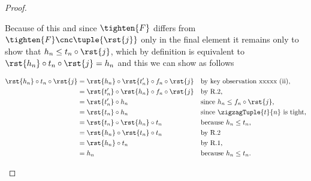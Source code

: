 \begin{proof}
\begin{enumerate}[(i)]
Because of this and since $\tighten{F}$ differs from
$\tighten{F} \cnc \tuple{\rst{j}}$
only in the final element it remains only to show that
$h_n \leq t_n \circ \rst{j}$, which by definition
is equivalent to
$\rst{h_n} \circ t_n \circ \rst{j} =h_n$
and this we can show as follows

\begin{align*}
\rst{h_n} \circ t_n \circ \rst{j} 
  &= \rst{h_n} \circ \rst{t'_n} \circ f_n \circ \rst{j} 
      && \mbox{by key observation xxxxx (ii),}\\
  &= \rst{t'_n} \circ \rst{h_n} \circ f_n \circ \rst{j}
      && \mbox{by R.2,}\\
  &= \rst{t'_n} \circ h_n
      && \mbox{since $h_n \leq f_n \circ \rst{j}$,}\\
  &= \rst{t_n} \circ h_n
      && \mbox{since $\zigzagTuple{t}{n}$ is tight,}\\
  &= \rst{t_n} \circ \rst{h_n} \circ t_n
      && \mbox{because $h_n \leq t_n$,}\\
  &= \rst{h_n} \circ \rst{t_n} \circ t_n
      && \mbox{by R.2} \\
  &= \rst{h_n} \circ t_n
      && \mbox{by R.1,} \\
  &= h_n
      && \mbox{because $h_n \leq t_n$.}
\end{align*}
\end{enumerate}
\end{proof}

